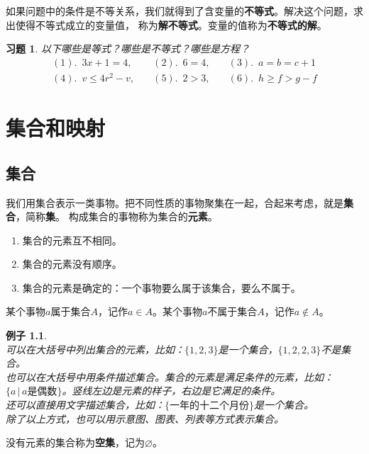 \documentclass[12pt,UTF8]{ctexbook}
\newtheorem{ex}{例子}[section]
\newtheorem{xt}{习题}[section]
\begin{document}
如果问题中的条件是不等关系，我们就得到了含变量的\textbf{不等式}。解决这个问题，求出使得不等式成立的变量值，
称为\textbf{解不等式}。变量的值称为\textbf{不等式的解}。

\begin{xt}\label{xt:1-2-0}
    以下哪些是等式？哪些是不等式？哪些是方程？
    $$
    \begin{array}{lll}
        (1). \,\,\, 3x + 1 = 4, \quad & (2). \,\,\, 6 = 4, \quad & (3). \,\,\, a = b = c+1  \\
        (4). \,\,\, v \leqslant 4r^2 - v, \quad & (5). \,\,\, 2 > 3, \quad & (6). \,\,\, h \geqslant f > g - f 
    \end{array}
    $$
\end{xt}

\chapter{集合和映射}
\section{集合}
我们用集合表示一类事物。把不同性质的事物聚集在一起，合起来考虑，就是\textbf{集合}，简称\textbf{集}。
构成集合的事物称为集合的\textbf{元素}。
\begin{enumerate}
    \item 集合的元素互不相同。
    \item 集合的元素没有顺序。
    \item 集合的元素是确定的：一个事物要么属于该集合，要么不属于。
\end{enumerate}

某个事物$a$属于集合$A$，记作$a\in A$。某个事物$a$不属于集合$A$，记作$a\notin A$。

\begin{ex}\label{ex:2-0-0}
    \mbox{} \\ 
    \indent 可以在大括号中列出集合的元素，比如：$\{1,2,3\}$是一个集合，$\{1,2,2,3\}$不是集合。 \\
    \indent 也可以在大括号中用条件描述集合。集合的元素是满足条件的元素，比如：$\{ a\, |\, a\mbox{是偶数}\}$。竖线左边是元素的样子，右边是它满足的条件。\\
    \indent 还可以直接用文字描述集合，比如：$\{\mbox{一年的十二个月份}\}$是一个集合。\\
    \indent 除了以上方式，也可以用示意图、图表、列表等方式表示集合。
\end{ex}

没有元素的集合称为\textbf{空集}，记为$\varnothing$。
\end{document}
